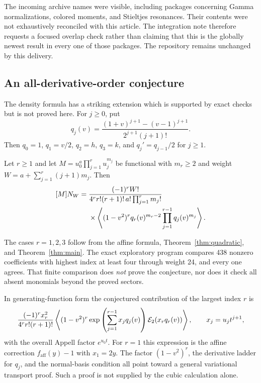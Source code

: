The incoming archive names were visible, including packages concerning
Gamma normalizations, colored moments, and Stieltjes resonances. Their
contents were not exhaustively reconciled with this article. The
integration note therefore requests a focused overlap check rather than
claiming that this is the globally newest result in every one of those
packages. The repository remains unchanged by this delivery.

\subsection{An all-derivative-order conjecture}
\label{sec:conjecture}
The density formula has a striking extension which is supported by exact
checks but is not proved here. For $j\ge0$, put
\begin{equation}\label{eq:qj}
 q_j(v)=\frac{(1+v)^{j+1}-(v-1)^{j+1}}
               {2^{j+1}(j+1)!}.
\end{equation}
Then $q_0=1$, $q_1=v/2$, $q_2=h$, $q_3=k$, and
$q_j'=q_{j-1}/2$ for $j\ge1$.

\begin{conjecture}
\label{conj:universal}
Let $r\ge1$ and let
$M=u_0^a\prod_{j=1}^ru_j^{m_j}$ be functional with $m_r\ge2$ and
weight $W=a+\sum_{j=1}^r(j+1)m_j$. Then
\begin{equation}\label{eq:universal-conjecture}
\begin{split}
 [M]N_W={}&\frac{(-1)^rW!}
 {4^r r!(r+1)!\,a!\prod_{j=1}^rm_j!}\\
 &\times\left\langle (1-v^2)^r q_r(v)^{m_r-2}
                   \prod_{j=1}^{r-1}q_j(v)^{m_j}\right\rangle.
\end{split}
\end{equation}
\end{conjecture}

The cases $r=1,2,3$ follow from the affine formula,
Theorem~\ref{thm:quadratic}, and Theorem~\ref{thm:main}. The exact
exploratory program compares 438 nonzero coefficients with highest index
at least four through weight 24, and every one agrees. That finite
comparison does \emph{not} prove the conjecture, nor does it check all
absent monomials beyond the proved sectors.

In generating-function form the conjectured contribution of the largest
index $r$ is
\begin{equation}\label{eq:universal-increment}
 \frac{(-1)^r x_r^2}{4^r r!(r+1)!}
 \left\langle (1-v^2)^r
   \exp\left(\sum_{j=1}^{r-1}x_jq_j(v)\right)\mathcal E_2(x_rq_r(v))\right\rangle,
 \qquad x_j=u_jt^{j+1},
\end{equation}
with the overall Appell factor $e^{u_0t}$. For $r=1$ this expression is
the affine correction $f_{\mathrm{aff}}(y)-1$ with $x_1=2y$.
The factor $(1-v^2)^r$, the derivative ladder for $q_j$, and the
normal-basis condition all point toward a general variational transport
proof. Such a proof is not supplied by the cubic calculation alone.

